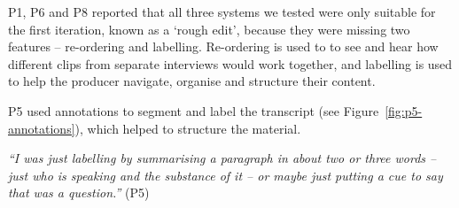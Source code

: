 



P1, P6 and P8 reported that all three systems we tested were only suitable for the first iteration, known as a `rough
edit', because they were missing two features -- re-ordering and labelling. Re-ordering is used to to see and hear how
different clips from separate interviews would work together, and labelling is used to help the producer navigate,
organise and structure their content. 




P5 used annotations to segment and label the transcript (see Figure~\ref{fig:p5-annotations}), which helped to
structure the material.

\textit{``I was just labelling by summarising a paragraph in about two or three words -- just who is speaking and the
substance of it -- or maybe just putting a cue to say that was a question.''} (P5) 


